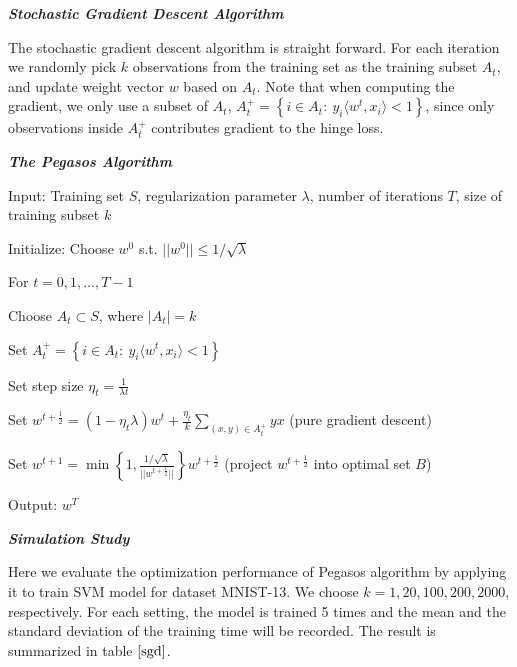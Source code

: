 \documentclass[12pt,oneside,a4paper]{article}
\begin{document}
\textbf{\em Stochastic Gradient Descent Algorithm}

The stochastic gradient descent algorithm is straight forward. For each iteration we randomly pick $k$ observations from the training set as the training subset $A_{t}$, and update weight vector $w$ based on $A_{t}$. Note that when computing the gradient, we only use a subset of $A_{t}$, $A_{t}^{+} = \left\{ i \in A_{t}:~y_{i}\langle w^{t}, x_{i}\rangle < 1   \right\}$, since only observations inside $A_{t}^{+}$ contributes gradient to the hinge loss.
\newline


\textbf{\em The Pegasos Algorithm}

Input: Training set $S$, regularization parameter $\lambda$, number of iterations $T$, size of training subset $k$

Initialize: Choose $w^{0}$ s.t. $||w^{0}|| \leq 1 / \sqrt{\lambda}$

For $t = 0, 1, \dots, T - 1$

\hspace{2ex} Choose $A_{t} \subset S$, where $|A_{t}| = k$

\hspace{2ex} Set $A_{t}^{+} = \left\{ i \in A_{t}:~y_{i}\langle w^{t}, x_{i}\rangle < 1   \right\}$

\hspace{2ex} Set step size $\eta_{t} = \frac{1}{\lambda t}$

\hspace{2ex} Set $w^{t + \frac{1}{2}} = (1 - \eta_{t}\lambda)w^{t} + \frac{\eta_{t}}{k}\sum_{(x,y)\in A_{t}^{+}}{yx}$ \hspace{2ex}(pure gradient descent)

\hspace{2ex} Set $w^{t + 1} = \min\left\{1, \frac{1/\sqrt{\lambda}}{||w^{t + \frac{1}{2}}||}\right\}w^{t + \frac{1}{2}}$ \hspace{2ex}(project $w^{t + \frac{1}{2}}$ into optimal set $B$)

Output: $w^{T}$
\newline

\textbf{\em Simulation Study}

Here we evaluate the optimization performance of Pegasos algorithm by applying it to train SVM model for dataset MNIST-13. We choose $k = 1, 20, 100, 200, 2000$, respectively. For each setting, the model is trained 5 times and the mean and the standard deviation of the training time will be recorded. The result is summarized in table $\ref{sgd}$.
\end{document}
